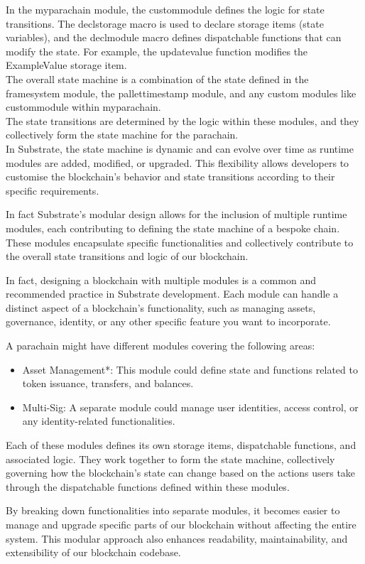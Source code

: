 \documentclass{tufte-handout}
\begin{document}
In the myparachain module, the custommodule defines the logic for state transitions. The declstorage macro is used to declare storage items (state variables), and the
declmodule macro defines dispatchable functions that can modify the state. 
For example, the updatevalue function modifies the ExampleValue storage item. \\
The overall state machine is a combination of the state defined in the framesystem module, the pallettimestamp module, and any custom modules like custommodule within myparachain. \\
The state transitions are determined by the logic within these modules, and they collectively form the state machine for the parachain. \\
In Substrate, the state machine is dynamic and can evolve over time as runtime modules are added, modified, or upgraded. This flexibility allows developers to customise the
blockchain's behavior and state transitions according to their specific requirements.

In fact Substrate's modular design allows for the inclusion of multiple runtime modules, each contributing to defining the state machine of a bespoke chain.
These modules encapsulate specific functionalities and collectively contribute to the overall state transitions and logic of our blockchain.

In fact, designing a blockchain with multiple modules is a common and recommended practice in Substrate development. Each module can handle a distinct aspect of
a blockchain's functionality, such as managing assets, governance, identity, or any other specific feature you want to incorporate.

A parachain might have different modules covering the following areas:
\begin{itemize}
\item Asset Management*: This module could define state and functions related to token issuance, transfers, and balances.
\item Multi-Sig: A separate module could manage user identities, access control, or any identity-related functionalities.
\end{itemize}
Each of these modules defines its own storage items, dispatchable functions, and associated logic. They work together to form the state machine,
collectively governing how the blockchain's state can change based on the actions users take through the dispatchable functions defined within these modules.

By breaking down functionalities into separate modules, it becomes easier to manage and upgrade specific parts of our blockchain without affecting the entire system. This
modular approach also enhances readability, maintainability, and extensibility of our blockchain codebase.
\end{document}
